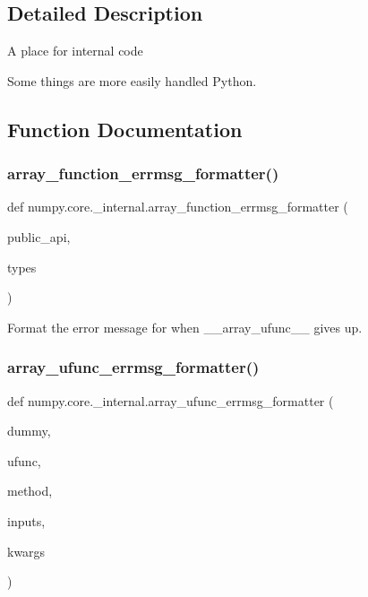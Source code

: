 \subsection{Detailed Description}
\begin{DoxyVerb}A place for internal code

Some things are more easily handled Python.\end{DoxyVerb}
 

\subsection{Function Documentation}
\mbox{\label{namespacenumpy_1_1core_1_1__internal_ae7b9bd39f6eb8523507e6748b9d8d700}} 
\subsubsection{\texorpdfstring{array\+\_\+function\+\_\+errmsg\+\_\+formatter()}{array\_function\_errmsg\_formatter()}}
{\footnotesize\ttfamily def numpy.\+core.\+\_\+internal.\+array\+\_\+function\+\_\+errmsg\+\_\+formatter (\begin{DoxyParamCaption}\item[{}]{public\+\_\+api,  }\item[{}]{types }\end{DoxyParamCaption})}

\begin{DoxyVerb}Format the error message for when __array_ufunc__ gives up. \end{DoxyVerb}
 \mbox{\label{namespacenumpy_1_1core_1_1__internal_a248f3bdfd562c3c96225b145054faca9}} 
\subsubsection{\texorpdfstring{array\+\_\+ufunc\+\_\+errmsg\+\_\+formatter()}{array\_ufunc\_errmsg\_formatter()}}
{\footnotesize\ttfamily def numpy.\+core.\+\_\+internal.\+array\+\_\+ufunc\+\_\+errmsg\+\_\+formatter (\begin{DoxyParamCaption}\item[{}]{dummy,  }\item[{}]{ufunc,  }\item[{}]{method,  }\item[{}]{inputs,  }\item[{}]{kwargs }\end{DoxyParamCaption})}

